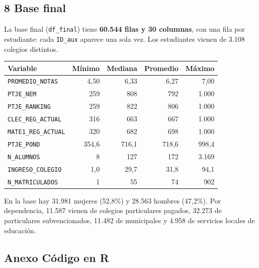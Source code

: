 \documentclass[11pt,letterpaper]{article}
\begin{document}
\subsection*{8 \; Base final}

La base final (\texttt{df\_final}) tiene \textbf{60.544 filas y 30
columnas}, con una fila por estudiante: cada \texttt{ID\_aux} aparece una
sola vez. Los estudiantes vienen de 3.108 colegios distintos.

\begin{center}
\begin{tabular}{lrrrr}
\toprule
\textbf{Variable} & \textbf{Mínimo} & \textbf{Mediana} & \textbf{Promedio} & \textbf{Máximo} \\
\midrule
\texttt{PROMEDIO\_NOTAS}   & 4,50  & 6,33  & 6,27  & 7,00 \\
\texttt{PTJE\_NEM}         & 259   & 808   & 792   & 1.000 \\
\texttt{PTJE\_RANKING}     & 259   & 822   & 806   & 1.000 \\
\texttt{CLEC\_REG\_ACTUAL} & 316   & 663   & 667   & 1.000 \\
\texttt{MATE1\_REG\_ACTUAL}& 320   & 682   & 698   & 1.000 \\
\texttt{PTJE\_POND}        & 354,6 & 716,1 & 718,6 & 998,4 \\
\texttt{N\_ALUMNOS}        & 8     & 127   & 172   & 3.169 \\
\texttt{INGRESO\_COLEGIO}  & 1,0   & 29,7  & 31,8  & 94,1 \\
\texttt{N\_MATRICULADOS}   & 1     & 55    & 74    & 902 \\
\bottomrule
\end{tabular}
\end{center}

En la base hay 31.981 mujeres (52,8\%) y 28.563 hombres (47,2\%). Por
dependencia, 11.587 vienen de colegios particulares pagados, 32.273 de
particulares subvencionados, 11.482 de municipales y 4.958 de servicios
locales de educación.

\newpage
\subsection*{Anexo \; Código en R}
\end{document}
